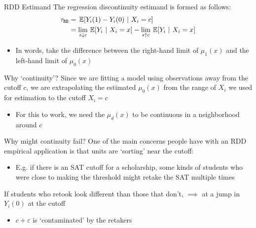 \documentclass[aspectratio=169,t,11pt,table]{beamer}
\begin{document}
\begin{frame}{RDD Estimand}
  The \alert{regression discontinuity} estimand is formed as follows:
  \begin{align*}
    \tau_{\texttt{RD}} &= 
    \expec{Y_i(1) - Y_i(0)}{X_i = c} \\
    &= \lim_{s\downarrow c} \expec{Y_i}{X_i = x} - \lim_{s \uparrow c} \expec{Y_i}{X_i = x} 
  \end{align*}

  \begin{itemize}
    \item In words, take the difference between the right-hand limit of $\mu_1(x)$ and the left-hand limit of $\mu_0(x)$
  \end{itemize}
\end{frame}

\begin{frame}{Why `continuity'?}
  Since we are fitting a model using observations away from the cutoff $c$, we are \alert{extrapolating} the estimated $\mu_0(x)$ from the range of $X_i$ we used for estimation to the cutoff $X_i = c$
  \begin{itemize}
    \item For this to work, we need the $\mu_d(x)$ to be continuous in a neighborhood around $c$
  \end{itemize}
\end{frame}

\begin{frame}{Why might continuity fail?}{}
  One of the main concerns people have with an RDD empirical application is that units are `sorting' near the cutoff:
  \begin{itemize}
    \item E.g. if there is an SAT cutoff for a scholarship, some kinds of students who were close to making the threshold might retake the SAT multiple times
  \end{itemize}

  \bigskip
  If students who retook look different than those that don't, $\implies$ at a jump in $Y_{i}(0)$ at the cutoff
  \begin{itemize}
    \item $c + \varepsilon$ is `contaminated' by the retakers 
  \end{itemize}
\end{frame}
\end{document}
